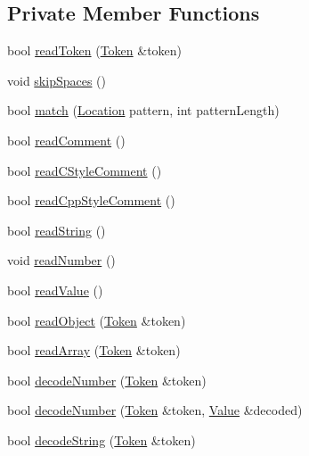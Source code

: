 \subsection*{Private Member Functions}
\begin{DoxyCompactItemize}
\item 
bool \hyperlink{class_json_1_1_reader_a7cb0631963cc0fd4ff6ed0f570976864}{read\+Token} (\hyperlink{class_json_1_1_reader_1_1_token}{Token} \&token)
\item 
void \hyperlink{class_json_1_1_reader_a40d0f69d15aeb2d52ff78d794f5ab8b2}{skip\+Spaces} ()
\item 
bool \hyperlink{class_json_1_1_reader_a3e5a7bc6b7b53f2ca8cb9da42f8ffb21}{match} (\hyperlink{class_json_1_1_reader_a46795b5b272bf79a7730e406cb96375a}{Location} pattern, int pattern\+Length)
\item 
bool \hyperlink{class_json_1_1_reader_ad2690e860a1b3332c5401fb0850ba065}{read\+Comment} ()
\item 
bool \hyperlink{class_json_1_1_reader_ae0ffe796abdc3c5851589ee500e28c79}{read\+C\+Style\+Comment} ()
\item 
bool \hyperlink{class_json_1_1_reader_a6716ef6290b0f469efaf8d379c357967}{read\+Cpp\+Style\+Comment} ()
\item 
bool \hyperlink{class_json_1_1_reader_a6328a0b1994e05118886f9fc9c608643}{read\+String} ()
\item 
void \hyperlink{class_json_1_1_reader_afb31bfda6bb27d6453057a47655e8363}{read\+Number} ()
\item 
bool \hyperlink{class_json_1_1_reader_a47e56844b803d41ec993a83fadf4495c}{read\+Value} ()
\item 
bool \hyperlink{class_json_1_1_reader_a0068eb3d8e86e91f0e4806f60da66b9c}{read\+Object} (\hyperlink{class_json_1_1_reader_1_1_token}{Token} \&token)
\item 
bool \hyperlink{class_json_1_1_reader_afd9a30c0af205c9f327613f486fae6b8}{read\+Array} (\hyperlink{class_json_1_1_reader_1_1_token}{Token} \&token)
\item 
bool \hyperlink{class_json_1_1_reader_a442d1f23edf0f4350f5eeab3ee3f7d46}{decode\+Number} (\hyperlink{class_json_1_1_reader_1_1_token}{Token} \&token)
\item 
bool \hyperlink{class_json_1_1_reader_a72f426ce3fa384d14aa10e9dd75618f0}{decode\+Number} (\hyperlink{class_json_1_1_reader_1_1_token}{Token} \&token, \hyperlink{class_json_1_1_value}{Value} \&decoded)
\item 
bool \hyperlink{class_json_1_1_reader_aaf736937912f5c9b8d221e57f209e3e0}{decode\+String} (\hyperlink{class_json_1_1_reader_1_1_token}{Token} \&token)

\end{DoxyCompactItemize}
